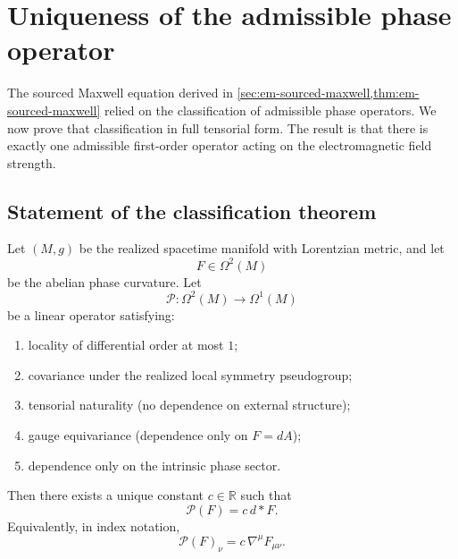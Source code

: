 \section{Uniqueness of the admissible phase operator}
\label{sec:em-operator-uniqueness}
The sourced Maxwell equation derived in
\cref{sec:em-sourced-maxwell,thm:em-sourced-maxwell} relied on
the classification of admissible phase operators.
We now prove that classification in full tensorial form.
The result is that there is exactly one admissible first-order operator
acting on the electromagnetic field strength.
\subsection{Statement of the classification theorem}
\begin{theorem}
	\label{thm:em-operator-uniqueness}
	Let $(M,g)$ be the realized spacetime manifold with Lorentzian metric,
	and let
	\[
		F \in \Omega^2(M)
	\]
	be the abelian phase curvature.
	Let
	\[
		\mathcal P:\Omega^2(M)\longrightarrow \Omega^1(M)
	\]
	be a linear operator satisfying:
	\begin{enumerate}
		\item locality of differential order at most $1$;
		\item covariance under the realized local symmetry pseudogroup;
		\item tensorial naturality (no dependence on external structure);
		\item gauge equivariance (dependence only on $F=dA$);
		\item dependence only on the intrinsic phase sector.
	\end{enumerate}
	Then there exists a unique constant $c\in\mathbb R$ such that
	\[
		\mathcal P(F) = c\, d{*}F.
	\]
	Equivalently, in index notation,
	\[
		\mathcal P(F)_\nu = c\, \nabla^\mu F_{\mu\nu}.
	\]
\end{theorem}
